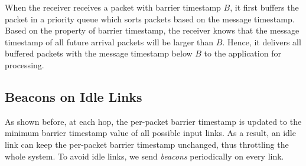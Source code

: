 When the receiver receives a packet with barrier timestamp $B$, it first buffers the packet in a priority queue which sorts packets based on the message timestamp.
Based on the property of barrier timestamp, the receiver knows that the message timestamp of all future arrival packets will be larger than $B$.
Hence, it delivers all buffered packets with the message timestamp below $B$ to the application for processing.






\subsection{Beacons on Idle Links}
\label{sec:beacon}

As shown before, at each hop, the per-packet barrier timestamp is updated to the minimum barrier timestamp value of all possible input links.
As a result, an idle link can keep the per-packet barrier timestamp unchanged, thus throttling the whole system.
To avoid idle links, we send \textit{beacons} periodically on every link.



